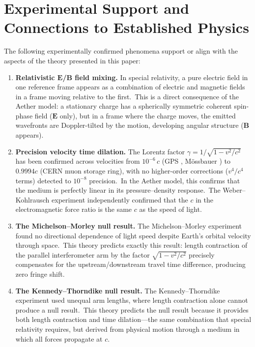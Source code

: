 ﻿\documentclass[12pt,letterpaper]{article}
\begin{document}
\section{Experimental Support and Connections to Established Physics}

The following experimentally confirmed phenomena support or align with the aspects of the theory presented in this paper:

\begin{enumerate}[leftmargin=2em]
  \item \textbf{Relativistic $\mathbf{E}$/$\mathbf{B}$ field mixing.} In special relativity, a pure electric field in one
    reference frame appears as a combination of electric and magnetic fields in a frame
    moving relative to the first.\ This is a direct consequence of the Aether model: a
    stationary charge has a spherically symmetric coherent spin-phase field
    ($\mathbf{E}$ only), but in a frame where the charge moves, the emitted
    wavefronts are Doppler-tilted by the motion, developing angular structure
    ($\mathbf{B}$ appears).

  \item \textbf{Precision velocity time dilation.} The Lorentz factor $\gamma = 1/\sqrt{1 - v^2/c^2}$ has
    been confirmed across velocities from $10^{-6}\,c$ (GPS \cite{ashby2003}, M\"ossbauer \cite{kundig1963}) to $0.9994c$ (CERN muon
    storage ring), with no higher-order corrections ($v^4/c^4$ terms) detected to $10^{-8}$
    precision.\ In the Aether model, this confirms that the medium is perfectly linear in
    its pressure--density response.\ The Weber--Kohlrausch experiment \cite{weber1856} independently confirmed that the $c$ in the
    electromagnetic force ratio is the same $c$ as the speed of light.

  \item \textbf{The Michelson--Morley null result.} The Michelson--Morley experiment \cite{michelson1887} found no directional dependence
    of light speed despite Earth's orbital velocity through space.\ This theory predicts
    exactly this result: length contraction of the parallel interferometer arm by the
    factor $\sqrt{1 - v^2/c^2}$ precisely compensates for the upstream/downstream travel
    time difference, producing zero fringe shift.

  \item \textbf{The Kennedy--Thorndike null result.} The Kennedy--Thorndike experiment \cite{kennedy1932} used unequal arm lengths,
    where length contraction alone cannot produce a null result.\ This theory predicts
    the null result because it provides both length contraction and time dilation---the
    same combination that special relativity requires, but derived from physical motion
    through a medium in which all forces propagate at $c$.


\end{enumerate}
\end{document}
